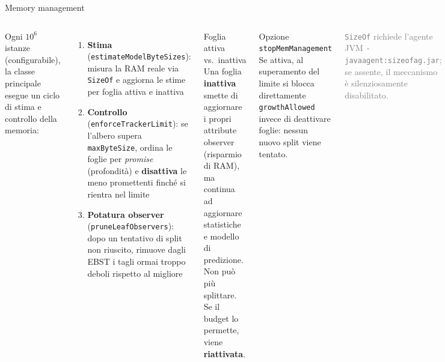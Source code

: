\documentclass[aspectratio=169,10pt]{beamer}
\begin{document}
\begin{frame}{Memory management}
  \begin{columns}[T]
    Ogni $10^6$ istanze (configurabile), la classe principale esegue un
    ciclo di stima e controllo della memoria:

    \medskip
    \begin{enumerate}
      \item \textbf{Stima} (\texttt{estimateModelByteSizes}):
            misura la RAM reale via \texttt{SizeOf} e aggiorna le stime
            per foglia attiva e inattiva
      \item \textbf{Controllo} (\texttt{enforceTrackerLimit}):
            se l'albero supera \texttt{maxByteSize}, ordina le foglie per
            \emph{promise} (profondità) e \textbf{disattiva} le meno
            promettenti finché si rientra nel limite
      \item \textbf{Potatura observer} (\texttt{pruneLeafObservers}):
            dopo un tentativo di split non riuscito, rimuove dagli EBST
            i tagli ormai troppo deboli rispetto al migliore
    \end{enumerate}

    \begin{alertblock}{Foglia attiva vs.\ inattiva}
      Una foglia \textbf{inattiva} smette di aggiornare i propri
      attribute observer (risparmio di RAM), ma continua ad
      aggiornare statistiche e modello di predizione.
      Non può più splittare.\\[4pt]
      Se il budget lo permette, viene \textbf{riattivata}.
    \end{alertblock}

    \medskip
    \begin{block}{Opzione \texttt{stopMemManagement}}
      Se attiva, al superamento del limite si blocca direttamente
      \texttt{growthAllowed} invece di deattivare foglie: nessun
      nuovo split viene tentato.
    \end{block}

    \medskip
    \textcolor{gray}{\small \texttt{SizeOf} richiede l'agente JVM
    \texttt{-javaagent:sizeofag.jar}; se assente, il meccanismo è
    silenziosamente disabilitato.}
  \end{columns}
\end{frame}
\end{document}
